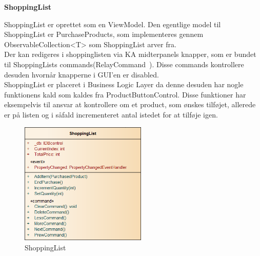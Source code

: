 \textbf{ShoppingList}

ShoppingList er oprettet som en ViewModel. Den egentlige model til ShoppingList er PurchaseProducts, som implementeres gennem ObservableCollection<T> som ShoppingList arver fra.\\
Der kan redigeres i shoppinglisten via \gls{KA} midterpanels knapper, som er bundet til ShoppingLists commands(RelayCommand~\cite{RelayC}). Disse commands kontrollere desuden hvornår knapperne i GUI'en er disabled.\\
ShoppingList er placeret i Business Logic Layer da denne desuden har nogle funktionens kald som kaldes fra ProductButtonControl. Disse funktioner har eksempelvis til ansvar at kontrollere om et product, som ønskes tilføjet, allerede er på listen og i såfald incrementeret antal istedet for at tilføje igen. 

\begin{figure}[H]
	\centering
	\includegraphics[width=60mm]{Systemdesign/Frontend/BLL/Pics/ShoppingList}
	\caption{ShoppingList}
	\label{fig:ShoppingList}
\end{figure}

\bigskip